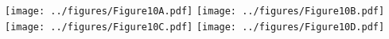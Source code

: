 \documentclass[class=minimal,border=0pt,varwidth]{standalone}
\begin{document}
\texttt{[image: ../figures/Figure10A.pdf]}
\texttt{[image: ../figures/Figure10B.pdf]}\\
\texttt{[image: ../figures/Figure10C.pdf]}
\texttt{[image: ../figures/Figure10D.pdf]}
\end{document}
